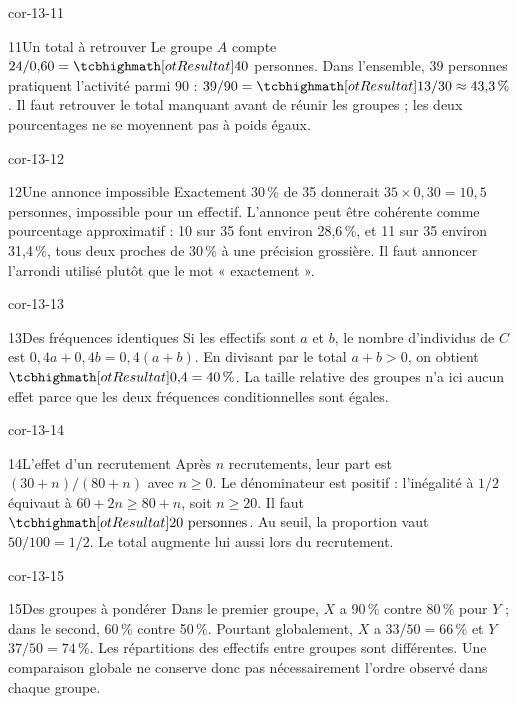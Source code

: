 \begin{blocLivre}{cor-13-11}
\begin{corrige}{11}{Un total à retrouver}
Le groupe $A$ compte $24/0{,}60=\res{40}$ personnes. Dans l’ensemble, 39 personnes pratiquent l’activité parmi 90 : $39/90=\res{13/30\approx43{,}3\,\%}$. Il faut retrouver le total manquant avant de réunir les groupes ; les deux pourcentages ne se moyennent pas à poids égaux.
\end{corrige}
\end{blocLivre}
\begin{blocLivre}{cor-13-12}
\begin{corrige}{12}{Une annonce impossible}
Exactement 30\,\% de 35 donnerait $35\times0{,}30=10{,}5$ personnes, impossible pour un effectif. L’annonce peut être cohérente comme pourcentage approximatif : 10 sur 35 font environ 28,6\,\%, et 11 sur 35 environ 31,4\,\%, tous deux proches de 30\,\% à une précision grossière. Il faut annoncer l’arrondi utilisé plutôt que le mot « exactement ».
\end{corrige}
\end{blocLivre}
\begin{blocLivre}{cor-13-13}
\begin{corrige}{13}{Des fréquences identiques}
Si les effectifs sont $a$ et $b$, le nombre d’individus de $C$ est $0{,}4a+0{,}4b=0{,}4(a+b)$. En divisant par le total $a+b>0$, on obtient $\res{0{,}4=40\,\%}$. La taille relative des groupes n’a ici aucun effet parce que les deux fréquences conditionnelles sont égales.
\end{corrige}
\end{blocLivre}
\begin{blocLivre}{cor-13-14}
\begin{corrige}{14}{L’effet d’un recrutement}
Après $n$ recrutements, leur part est $(30+n)/(80+n)$ avec $n\ge0$. Le dénominateur est positif : l’inégalité à $1/2$ équivaut à $60+2n\ge80+n$, soit $n\ge20$. Il faut $\res{20\text{ personnes}}$. Au seuil, la proportion vaut $50/100=1/2$. Le total augmente lui aussi lors du recrutement.
\end{corrige}
\end{blocLivre}
\begin{blocLivre}{cor-13-15}
\begin{corrige}{15}{Des groupes à pondérer}
Dans le premier groupe, $X$ a 90\,\% contre 80\,\% pour $Y$ ; dans le second, 60\,\% contre 50\,\%. Pourtant globalement, $X$ a $33/50=66\,\%$ et $Y$ $37/50=74\,\%$. Les répartitions des effectifs entre groupes sont différentes. Une comparaison globale ne conserve donc pas nécessairement l’ordre observé dans chaque groupe.
\end{corrige}
\end{blocLivre}
